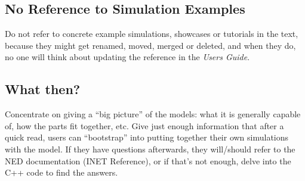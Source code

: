 \subsection{No Reference to Simulation Examples}

Do not refer to concrete example simulations, showcases or tutorials in the text,
because they might get renamed, moved, merged or deleted, and when they
do, no one will think about updating the reference in the \textit{Users Guide}. 


\subsection{What then?}

Concentrate on giving a ``big picture'' of the models: what it is generally
capable of, how the parts fit together, etc. Give just enough information
that after a quick read, users can ``bootstrap'' into putting together
their own simulations with the model. If they have questions afterwards,
they will/should refer to the NED documentation (INET Reference), or if 
that's not enough, delve into the C++ code to find the answers.
 



